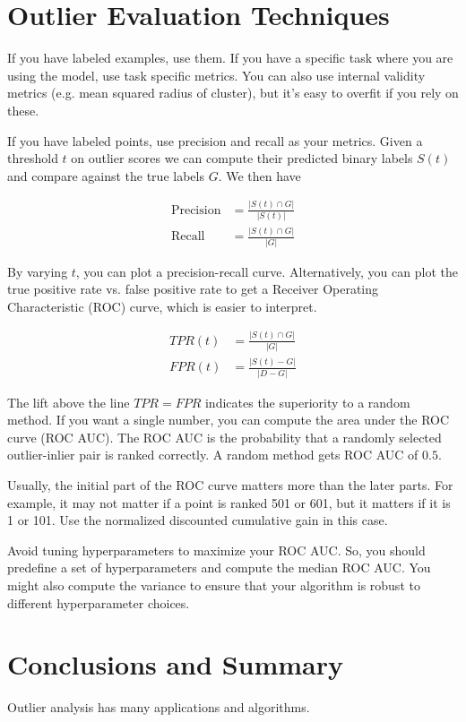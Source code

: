 \documentclass[a4paper]{article}
\begin{document}
\section{Outlier Evaluation Techniques}
If you have labeled examples, use them. If you have a specific task where you
are using the model, use task specific metrics. You can also use internal
validity metrics (e.g. mean squared radius of cluster), but it's easy to overfit
if you rely on these.

If you have labeled points, use precision and recall as your metrics. Given a
threshold $t$ on outlier scores we can compute their predicted binary labels
$S(t)$ and compare against the true labels $G$. We then have

\begin{align}
  \text{Precision} &= \frac{|S(t) \cap G|}{|S(t)|} \\
  \text{Recall} &= \frac{|S(t) \cap G|}{|G|}
\end{align}

By varying $t$, you can plot a precision-recall curve. Alternatively, you
can plot the true positive rate vs. false positive rate to get a Receiver
Operating Characteristic (ROC) curve, which is easier to interpret.

\begin{align}
  TPR(t) &= \frac{|S(t) \cap G|}{|G|} \\
  FPR(t) &= \frac{|S(t) - G|}{|D - G|}
\end{align}

The lift above the line $TPR = FPR$ indicates the superiority to a random
method. If you want a single number, you can compute the area under the ROC
curve (ROC AUC). The ROC AUC is the probability that a randomly selected
outlier-inlier pair is ranked correctly. A random method gets ROC AUC of $0.5$.

Usually, the initial part of the ROC curve matters more than the later parts.
For example, it may not matter if a point is ranked 501 or 601, but it matters
if it is 1 or 101. Use the normalized discounted cumulative gain in this case.

Avoid tuning hyperparameters to maximize your ROC AUC. So, you should predefine
a set of hyperparameters and compute the median ROC AUC. You might also
compute the variance to ensure that your algorithm is robust to different
hyperparameter choices.

\section{Conclusions and Summary}
Outlier analysis has many applications and algorithms.
\end{document}

